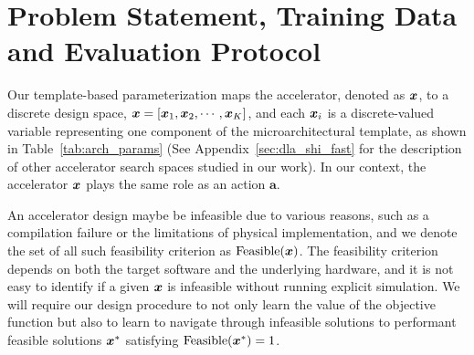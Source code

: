 \vspace{-0.2cm}
\section{Problem Statement, Training Data and Evaluation Protocol}
\label{sec:accel}
\vspace{-0.2cm}
%
Our template-based parameterization maps the accelerator, denoted as ${\boldsymbol{x}}$, to a discrete design space, ${\boldsymbol{x}} = [{\boldsymbol{x}}_1, {\boldsymbol{x}}_2, \cdots, {\boldsymbol{x}}_K]$, and each ${\boldsymbol{x}}_i$ is a discrete-valued variable representing one component of the microarchitectural template, as shown in Table~\ref{tab:arch_params} (See Appendix~\ref{sec:dla_shi_fast} for the description of other accelerator search spaces studied in our work). In our context, the accelerator ${\boldsymbol{x}}$ plays the same role as an action $\mathbf{a}$.

%
An accelerator design maybe be infeasible due to various reasons, such as a compilation failure or the limitations of physical implementation, and we denote the set of all such feasibility criterion as $\mathrm{Feasible}({\boldsymbol{x}})$. The feasibility criterion depends on both the target software and the underlying hardware, and it is not easy to identify if a given ${\boldsymbol{x}}$ is infeasible without running explicit simulation. We will require our design procedure to not only learn the value of the objective function but also to learn to navigate through infeasible solutions to performant feasible solutions ${\boldsymbol{x}}^*$ satisfying $\mathrm{Feasible}({\boldsymbol{x}}^*) = 1$. 

